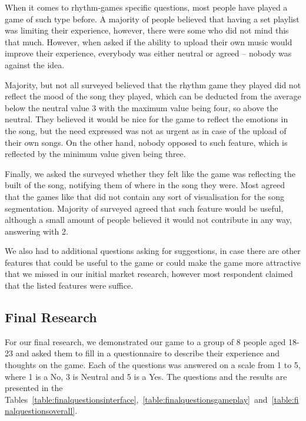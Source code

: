 When it comes to rhythm-games specific questions, most people have played a game of such type before. A majority of people believed that having a set playlist was limiting their experience, however, there were some who did not mind this that much. However, when asked if the ability to upload their own music would improve their experience, everybody was either neutral or agreed -- nobody was against the idea. 

Majority, but not all surveyed believed that the rhythm game they played did not reflect the mood of the song they played, which can be deducted from the average below the neutral value 3 with the maximum value being four, so above the neutral. They believed it would be nice for the game to reflect the emotions in the song, but the need expressed was not as urgent as in case of the upload of their own songs. On the other hand, nobody opposed to such feature, which is reflected by the minimum value given being three.

Finally, we asked the surveyed whether they felt like the game was reflecting the built of the song, notifying them of where in the song they were. Most agreed that the games like that did not contain any sort of visualisation for the song segmentation. Majority of surveyed agreed that such feature would be useful, although a small amount of people believed it would not contribute in any way, answering with 2.

We also had to additional questions asking for suggestions, in case there are other features that could be useful to the game or could make the game more attractive that we missed in our initial market research, however most respondent claimed that the listed features were suffice.

\vspace{10pt}
\subsection*{Final Research}

For our final research, we demonstrated our game to a group of 8 people aged 18-23 and asked them to fill in a questionnaire to describe their experience and thoughts on the game. Each of the questions was answered on a scale from 1 to 5, where 1 is a No,  3 is Neutral and 5 is a Yes. The questions and the results are presented in the Tables~\ref{table:finalquestionsinterface},~\ref{table:finalquestionsgameplay}~and~\ref{table:finalquestionsoverall}.


